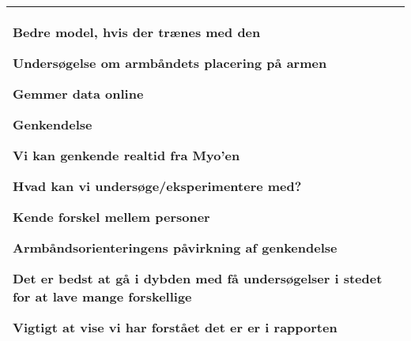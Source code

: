 \begin{center}
\begin{tabular}{| l | p{10cm} |}
\begin{myEnumerate}
\begin{myItemize}
\begin{myItemize}
					\item Bedre model, hvis der trænes med den
					\item Undersøgelse om armbåndets placering på armen
					\item Gemmer data online
				\end{myItemize}
				\item Genkendelse
				\begin{myItemize}
					\item Vi kan genkende realtid fra Myo'en
				\end{myItemize}
			\end{myItemize}
			\item Hvad kan vi undersøge/eksperimentere med?
			\begin{myItemize}
				\item Kende forskel mellem personer
				\item Armbåndsorienteringens påvirkning af genkendelse
				\item Det er bedst at gå i dybden med få undersøgelser i stedet for at lave mange forskellige
				\item Vigtigt at vise vi har forstået det er er i rapporten
			\end{myItemize}
		\end{myEnumerate}\\ 	
		\hline
	\end{tabular}
\end{center}

